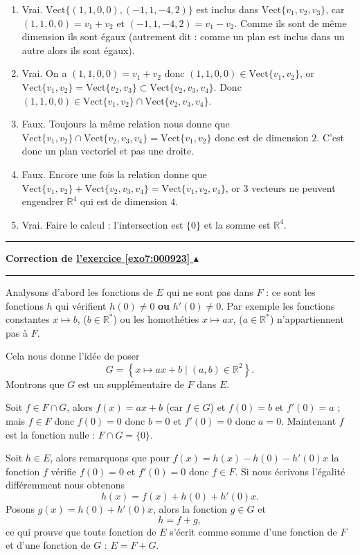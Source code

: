 \documentclass[11pt,a4paper]{article}
\newcommand{\Rr}{\mathbb{R}} \newcommand{\R}{\mathbb{R}}
\newcounter{exo}
\newcommand{\correction}[1]{\hypertarget{cor7:#1}{}\label{cor7:#1}{\bf Correction de \hyperlink{exo7:#1}{l'exercice \ref{exo7:#1} $\blacktriangle$}}\vspace{1mm}\hrule\vspace{1mm}}
\newcommand{\fincorrection}{\vspace{1mm}\hrule\vspace*{7mm}}
\begin{document}
\begin{enumerate}
\item Vrai. $\text{Vect}\{(1,1,0,0),(-1,1,-4,2)\}$ est inclus dans $\text{Vect} \{v_1,v_2,v_3\}$, car
$(1,1,0,0) = v_1+v_2$ et $(-1,1,-4,2)=v_1-v_2$. Comme ils sont de m\^eme dimension ils sont \'egaux 
(autrement dit : comme un plan est inclus dans un autre alors ils sont égaux).
\item Vrai. On a $(1,1,0,0) = v_1+v_2$ donc  $(1,1,0,0)\in \text{Vect}\{v_1,v_2\}$, or 
$\text{Vect}\{v_1,v_2\}=\text{Vect}\{v_2,v_3\}\subset \text{Vect}\{v_2,v_3,v_4\}$. 
Donc $(1,1,0,0) \in \text{Vect}\{v_1, v_2\} \cap    \text{Vect}\{v_2, v_3, v_4\}$.
\item Faux. Toujours la m\^eme relation nous donne que 
$\text{Vect} \{v_1, v_2\} \cap \text{Vect} \{v_2, v_3, v_4\} = \text{Vect}\{v_1, v_2\}$ donc est de dimension $2$.
C'est donc un plan vectoriel et pas une droite.
 \item Faux. Encore une fois la relation donne que 
$\text{Vect}\{v_1, v_2\}+\text{Vect}\{v_2, v_3, v_4\} = \text{Vect}\{v_1, v_2, v_4\}$, or $3$ vecteurs ne
   peuvent engendrer $\Rr^4$ qui est de dimension $4$.
\item Vrai.  Faire le calcul : l'intersection est $\{0\}$ et la somme est $\Rr^4$.
\end{enumerate}
\fincorrection
\correction{000923}
  Analysons d'abord les fonctions de $E$ qui ne sont pas dans $F$ : ce sont 
  les fonctions $h$ qui v\'erifient $h(0) \neq 0$ \textbf{ou} $h'(0) \neq 0$. Par exemple
  les fonctions constantes $x \mapsto b$, ($b \in \Rr^*$) ou les
  homoth\'eties $x \mapsto a x$, ($a \in \Rr^*$) n'appartiennent pas \`a
  $F$.
  
  Cela nous donne l'idée de poser
  $$G= \left\lbrace x \mapsto ax+b \mid (a,b) \in \Rr^2 \right\rbrace.$$
  Montrons que $G$ est un suppl\'ementaire de $F$ dans $E$.
  
  Soit $f \in F \cap G$, alors $f(x) = ax+b$ (car $f\in G$) et $f(0) =
  b$ et $f'(0)=a$ ; mais $f\in F$ donc $f(0) = 0$ donc $b=0$ et
  $f'(0)=0$ donc $a=0$. Maintenant $f$ est la fonction nulle : $F\cap
  G = \{ 0 \}$.
  
  Soit $h \in E$, alors remarquons que pour $f(x) = h(x) - h(0)
  -h'(0)x$ la fonction $f$ v\'erifie $f(0) = 0$ et $f'(0)=0$ donc $f \in
  F$. Si nous \'ecrivons l'\'egalit\'e diff\'eremment nous obtenons
  $$
  h(x) = f(x) +h(0)+h'(0)x.$$
  Posons $g(x) = h(0)+h'(0)x$, alors la
  fonction $g \in G$ et
  $$h =f +g,$$
  ce qui prouve que toute fonction de $E$ s'\'ecrit comme
  somme d'une fonction de $F$ et d'une fonction de $G$ : $E = F + G$.
  
\end{document}
